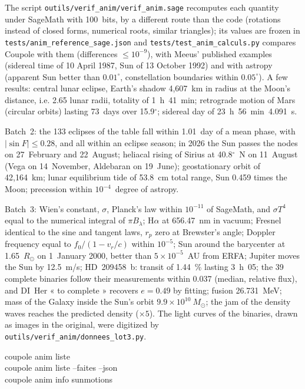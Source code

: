 The script \texttt{outils/verif\_anim/verif\_anim.sage} recomputes each quantity under SageMath with 100~bits, by a
different route than the code (rotations instead of closed forms, numerical roots, similar triangles); its values are
frozen in \texttt{tests/anim\_reference\_sage.json} and \texttt{tests/test\_anim\_calculs.py} compares Coupole with
them (differences $\le 10^{-9}$), with Meeus' published examples (sidereal time of 10 April 1987, Sun of 13 October
1992) and with astropy (apparent Sun better than $0.01^\circ$, constellation boundaries within $0.05^\circ$). A few
results: central lunar eclipse, Earth's shadow 4,607~km in radius at the Moon's distance, i.e. 2.65 lunar radii,
totality of 1~h~41~min; retrograde motion of Mars (circular orbits) lasting 73~days over 15.9$^\circ$; sidereal day of
23~h~56~min~4.091~s.

Batch~2: the 133 eclipses of the table fall within 1.01~day of a mean phase, with $|\sin F|\le0.28$, and all within
an eclipse season; in 2026 the Sun passes the nodes on 27~February and 22~August; heliacal rising of Sirius at
40.8$^\circ$~N on 11~August (Vega on 14~November, Aldebaran on 19~June); geostationary orbit of 42,164~km; lunar
equilibrium tide of 53.8~cm total range, Sun 0.459 times the Moon; precession within $10^{-4}$~degree of astropy.

Batch~3: Wien's constant, $\sigma$, Planck's law within $10^{-11}$ of SageMath, and $\sigma T^4$ equal to the
numerical integral of $\pi B_\lambda$; H$\alpha$ at 656.47~nm in vacuum; Fresnel identical to the sine and tangent laws,
$r_p$ zero at Brewster's angle; Doppler frequency equal to $f_0/(1-v_r/c)$ within $10^{-5}$; Sun around the barycenter
at 1.65~$R_\odot$ on 1~January 2000, better than $5\times10^{-5}$~AU from ERFA; Jupiter moves the Sun by 12.5~m/s;
HD~209458~b: transit of 1.44~\% lasting 3~h~05; the 39 complete binaries follow their measurements within 0.037
(median, relative flux), and DI~Her « to complete » recovers $e=0.49$ by fitting; fusion 26.731~MeV; mass of the
Galaxy inside the Sun's orbit $9.9\times10^{10}~M_\odot$; the jam of the density waves reaches the predicted density
($\times5$).  The light curves of the binaries, drawn as images in the original, were digitized by
\texttt{outils/verif\_anim/donnees\_lot3.py}.

\begin{ccode}
coupole anim liste\\
coupole anim liste --faites --json\\
coupole anim info sunmotions
\end{ccode}


